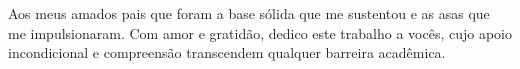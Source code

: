 
\begin{flushright}
\justify
Aos meus amados pais que foram a base sólida que me sustentou e as asas que me impulsionaram.
Com amor e gratidão, dedico este trabalho a vocês, cujo apoio incondicional e compreensão transcendem qualquer barreira acadêmica. 
\end{flushright}


